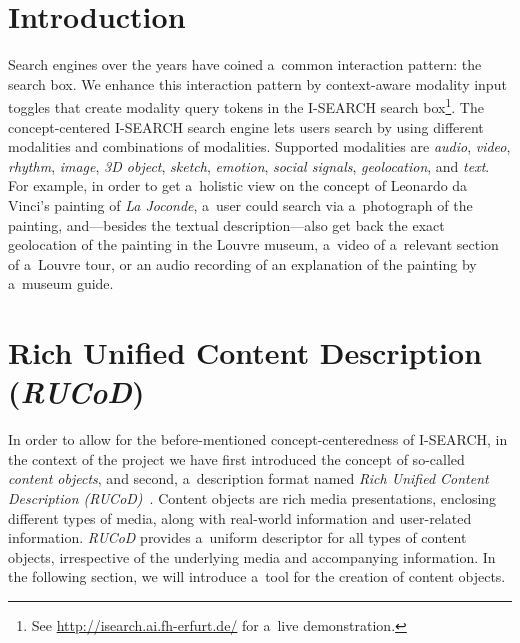 \documentclass[runningheads,a4paper]{llncs}
\begin{document}
\section{Introduction}
Search engines over the years have coined a~common interaction pattern:
the search box.
We enhance this interaction pattern by context-aware modality input toggles
that create modality query tokens in the \mbox{I-SEARCH} search
box\footnote{See \url{http://isearch.ai.fh-erfurt.de/} for a~live demonstration.}.
The concept-centered \mbox{I-SEARCH} search engine lets users search
by using different modalities and combinations of modalities.
Supported modalities are \emph{audio}, \emph{video},
\emph{rhythm}, \emph{image}, \emph{3D object}, \emph{sketch}, \emph{emotion},
\emph{social signals}, \emph{geolocation}, and \emph{text}.
For example, in order to get a~holistic view on the concept of
Leonardo da Vinci's painting of \emph{La Joconde},
a~user could search via a~photograph of the painting,
and---besides the textual description---also get back
the exact geolocation of the painting in the Louvre museum,
a~video of a~relevant section of a~Louvre tour,
or an audio recording of an explanation of the painting by a~museum guide.

\section{Rich Unified Content Description (\emph{RUCoD})}
In order to allow for the before-mentioned concept-centeredness of
\mbox{I-SEARCH}, in the context of the project we have first introduced
the concept of so-called \emph{content objects}, and second,
a~description format named \emph{Rich Unified Content Description
\mbox{(RUCoD)}}~\cite{ijmis2010}.
Content objects are rich media presentations, enclosing different types of media,
along with real-world information and user-related information.
\mbox{\emph{RUCoD}} provides a~uniform descriptor for all types of content objects,
irrespective of the underlying media and accompanying information.
In the following section, we will introduce a~tool for the creation of content objects.
\end{document}
